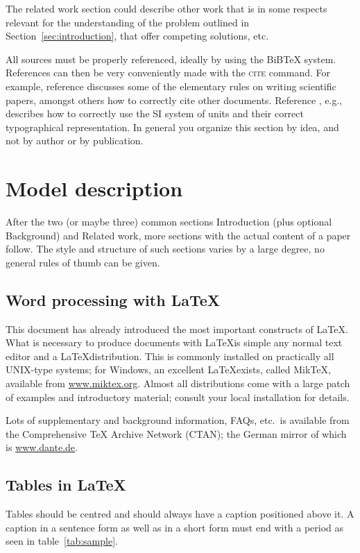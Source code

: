 \documentclass[12pt]{article}
\theoremstyle{plain}
\theoremstyle{definition}
\theoremstyle{remark}
\begin{document}
The related work section could describe other work that is in some respects relevant for the understanding of the problem outlined in Section~\ref{sec:introduction}, that offer competing solutions, etc.

All sources must be properly referenced, ideally by using the BiBTeX system. References can then be very conveniently made with the \textsc{cite} command. For example, reference
\cite{Leunen:Scholars:92} discusses some of the elementary rules on
writing scientific papers, amongst others how to correctly cite other
documents. Reference \cite{Taylor:SIGuide:95}, e.g., describes how to
correctly use the SI system of units and their correct typographical
representation. In general you organize this section by idea, and not by author or by publication.

\section{Model description}
\label{sec:model}

After the two (or maybe three) common sections Introduction (plus optional Background) and Related work, more sections with the actual content of a paper follow. The style and
structure of such sections varies by a large degree, no general rules
of thumb can be given. 

\subsection{Word processing with \LaTeX}
\label{sec:model:subsec:latex}

This document has already introduced the most important constructs of
\LaTeX. What is necessary to produce documents with \LaTeX is simple
any normal text editor and a \LaTeX distribution. This is commonly
installed on practically all UNIX-type systems; for Windows, an
excellent \LaTeX exists, called MikTeX, available from
\url{www.miktex.org}. Almost all distributions come with a large patch
of examples and introductory material; consult your local installation
for details. 

Lots of supplementary and background information, FAQs, etc.\ is
available from the Comprehensive TeX Archive Network (CTAN); the
German mirror of which is \url{www.dante.de}. 

\subsection{Tables in \LaTeX}
\label{sec:model:subsec:tables}
Tables should be centred and should always have a caption 
positioned above it. A caption in a sentence form as well as in a short form must end with a period as seen in table~\ref{tab:sample}.
\end{document}

